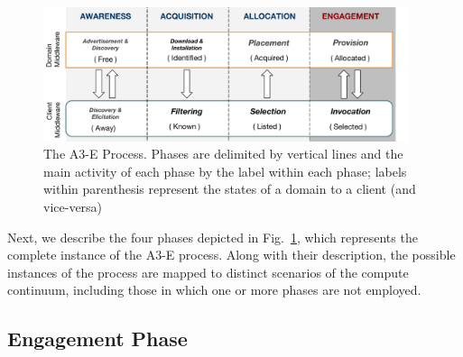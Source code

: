 


\begin{figure}[tbp]
	\includegraphics[width=0.95\textwidth]{figs/A3-E-process}
	\caption{The A3-E Process. Phases are delimited by vertical lines and the main activity of each phase by the label within each phase; labels within parenthesis represent the states of a domain to a client (and vice-versa)}
	\label{fig:A3-E-process}
\end{figure}

Next, we describe the four phases depicted in Fig.~\ref{fig:A3-E-process}, which represents the complete instance of the A3-E process. Along with their description, the possible instances of the process are mapped to distinct scenarios of the compute continuum, including those in which one or more phases are not employed.



\subsection{Engagement Phase}\label{sec:A3-E-engagement}

